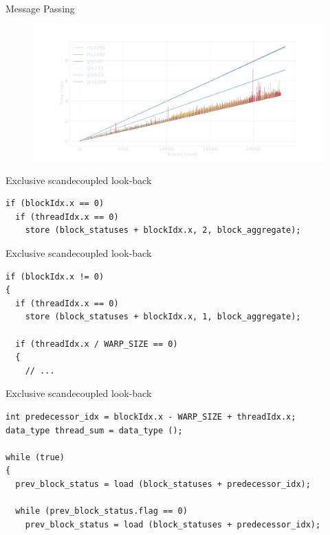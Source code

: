 \documentclass[aspectratio=169,compress]{beamer}
\begin{document}
\begin{frame}[fragile]{Message Passing}{}
\centering
	\begin{figure}
		\includegraphics[width=\textwidth]{mp_elap.pdf}
	\end{figure}
\end{frame}


\begin{frame}[fragile]{Exclusive scan}{decoupled look-back}

\vspace{0.1in}

\begin{lstlisting}[showstringspaces=false]
if (blockIdx.x == 0)
  if (threadIdx.x == 0)
    store (block_statuses + blockIdx.x, 2, block_aggregate);
\end{lstlisting}
\end{frame}

\begin{frame}[fragile]{Exclusive scan}{decoupled look-back}

\vspace{0.1in}

\begin{lstlisting}[showstringspaces=false]
if (blockIdx.x != 0) 
{
  if (threadIdx.x == 0)
    store (block_statuses + blockIdx.x, 1, block_aggregate);
  
  if (threadIdx.x / WARP_SIZE == 0)
  {
    // ...
\end{lstlisting}
\end{frame}

\begin{frame}[fragile]{Exclusive scan}{decoupled look-back}

\vspace{0.1in}

\begin{lstlisting}[showstringspaces=false]
int predecessor_idx = blockIdx.x - WARP_SIZE + threadIdx.x;
data_type thread_sum = data_type ();

while (true)
{
  prev_block_status = load (block_statuses + predecessor_idx);

  while (prev_block_status.flag == 0)
    prev_block_status = load (block_statuses + predecessor_idx);
\end{lstlisting}
\end{frame}
\end{document}

